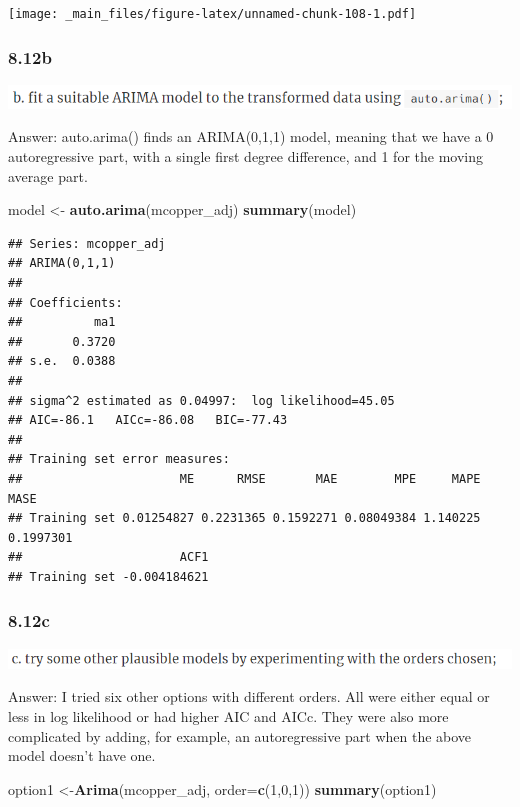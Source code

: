 \documentclass[]{book}
\newenvironment{Shaded}{\begin{snugshade}}{\end{snugshade}}
\newcommand{\DataTypeTok}[1]{\textcolor[rgb]{0.13,0.29,0.53}{#1}}
\newcommand{\DecValTok}[1]{\textcolor[rgb]{0.00,0.00,0.81}{#1}}
\newcommand{\KeywordTok}[1]{\textcolor[rgb]{0.13,0.29,0.53}{\textbf{#1}}}
\newcommand{\NormalTok}[1]{#1}
\newcommand{\StringTok}[1]{\textcolor[rgb]{0.31,0.60,0.02}{#1}}
\begin{document}
\texttt{[image: \_main\_files/figure-latex/unnamed-chunk-108-1.pdf]}

\hypertarget{b-9}{%
\subsubsection{8.12b}\label{b-9}}

\includegraphics{./week5/8.12b.png}

Answer: auto.arima() finds an ARIMA(0,1,1) model, meaning that we have a 0 autoregressive part, with a single first degree difference, and 1 for the moving average part.

\begin{Shaded}
\begin{Highlighting}[]
\NormalTok{model <-}\StringTok{ }\KeywordTok{auto.arima}\NormalTok{(mcopper_adj)}
\KeywordTok{summary}\NormalTok{(model)}
\end{Highlighting}
\end{Shaded}

\begin{verbatim}
## Series: mcopper_adj 
## ARIMA(0,1,1) 
## 
## Coefficients:
##          ma1
##       0.3720
## s.e.  0.0388
## 
## sigma^2 estimated as 0.04997:  log likelihood=45.05
## AIC=-86.1   AICc=-86.08   BIC=-77.43
## 
## Training set error measures:
##                      ME      RMSE       MAE        MPE     MAPE      MASE
## Training set 0.01254827 0.2231365 0.1592271 0.08049384 1.140225 0.1997301
##                      ACF1
## Training set -0.004184621
\end{verbatim}

\hypertarget{c-8}{%
\subsubsection{8.12c}\label{c-8}}

\includegraphics{./week5/8.12c.png}

Answer: I tried six other options with different orders. All were either equal or less in log likelihood or had higher AIC and AICc. They were also more complicated by adding, for example, an autoregressive part when the above model doesn't have one.

\begin{Shaded}
\begin{Highlighting}[]
\NormalTok{option1 <-}\KeywordTok{Arima}\NormalTok{(mcopper_adj, }\DataTypeTok{order=}\KeywordTok{c}\NormalTok{(}\DecValTok{1}\NormalTok{,}\DecValTok{0}\NormalTok{,}\DecValTok{1}\NormalTok{))}
\KeywordTok{summary}\NormalTok{(option1)}
\end{Highlighting}
\end{Shaded}
\end{document}
